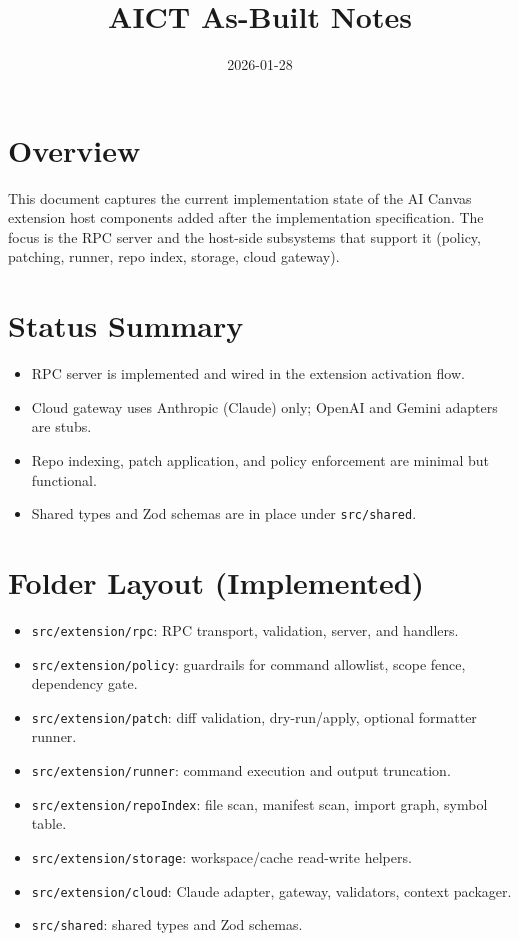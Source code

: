 \documentclass[11pt]{article}
\title{AICT As-Built Notes}
\author{}
\date{2026-01-28}
\begin{document}
\maketitle
\tableofcontents

\section{Overview}
This document captures the current implementation state of the AI Canvas extension host
components added after the implementation specification. The focus is the RPC server and the
host-side subsystems that support it (policy, patching, runner, repo index, storage, cloud gateway).

\section{Status Summary}
\begin{itemize}[noitemsep]
  \item RPC server is implemented and wired in the extension activation flow.
  \item Cloud gateway uses Anthropic (Claude) only; OpenAI and Gemini adapters are stubs.
  \item Repo indexing, patch application, and policy enforcement are minimal but functional.
  \item Shared types and Zod schemas are in place under \texttt{src/shared}.
\end{itemize}

\section{Folder Layout (Implemented)}
\begin{itemize}[noitemsep]
  \item \texttt{src/extension/rpc}: RPC transport, validation, server, and handlers.
  \item \texttt{src/extension/policy}: guardrails for command allowlist, scope fence, dependency gate.
  \item \texttt{src/extension/patch}: diff validation, dry-run/apply, optional formatter runner.
  \item \texttt{src/extension/runner}: command execution and output truncation.
  \item \texttt{src/extension/repoIndex}: file scan, manifest scan, import graph, symbol table.
  \item \texttt{src/extension/storage}: workspace/cache read-write helpers.
  \item \texttt{src/extension/cloud}: Claude adapter, gateway, validators, context packager.
  \item \texttt{src/shared}: shared types and Zod schemas.
\end{itemize}
\end{document}
